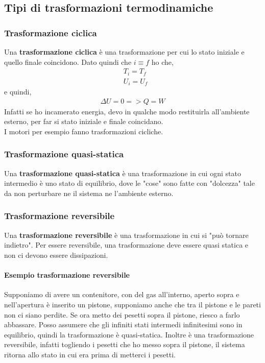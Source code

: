     \subsection{Tipi di trasformazioni termodinamiche}

        \subsubsection{Trasformazione ciclica}
            Una \textbf{trasformazione ciclica} è una trasformazione per cui lo stato iniziale e quello finale coincidono. Dato quindi che $i\equiv f$ ho che,
            \begin{align*}
                &T_i = T_f\\
                &U_i = U_f
            \end{align*}
            e quindi,
            \begin{align*}
                \Delta U = 0 => Q = W
            \end{align*}
            Infatti se ho incamerato energia, devo in qualche modo restituirla all'ambiente esterno, per far si stato iniziale e finale coincidano.\\
            I motori per esempio fanno trasformazioni cicliche.

        \subsubsection{Trasformazione quasi-statica}
            Una \textbf{trasformazione quasi-statica} è una trasformazione in cui ogni stato intermedio è uno stato di equilibrio, dove le "cose" sono fatte con "dolcezza" tale da non perturbare ne il sistema ne l'ambiente esterno.

        \subsubsection{Trasformazione reversibile}
            Una \textbf{trasformazione reversibile} è una trasformazione in cui si "può tornare indietro". Per essere reversibile, una trasformazione deve essere quasi statica e non ci devono essere dissipazioni.

            \paragraph{Esempio trasformazione reversibile}
                Supponiamo di avere un contenitore, con del gas all'interno, aperto sopra e nell'apertura è inserito un pistone, supponiamo anche che tra il pistone e le pareti non ci siano perdite. Se ora metto dei pesetti sopra il pistone, riesco a farlo abbassare. Posso assumere che gli infiniti stati intermedi infinitesimi sono in equilibrio, quindi la trasformazione è quasi-statica. Inoltre è una trasformazione reversibile, infatti togliendo i pesetti che ho messo sopra il pistone, il sistema ritorna allo stato in cui era prima di metterci i pesetti.

